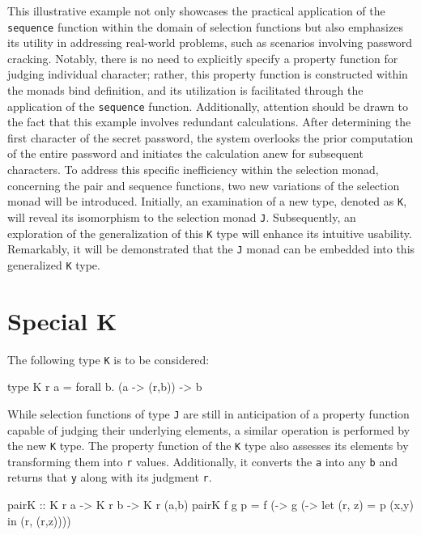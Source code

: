 \documentclass[runningheads]{llncs}
\begin{document}
This illustrative example not only showcases the practical application
of the \texttt{sequence} function within the domain of selection
functions but also emphasizes its utility in addressing real-world
problems, such as scenarios involving password cracking. Notably, there
is no need to explicitly specify a property function for judging
individual character; rather, this property function is constructed
within the monads bind definition, and its utilization is facilitated
through the application of the \texttt{sequence} function. Additionally,
attention should be drawn to the fact that this example involves
redundant calculations. After determining the first character of the
secret password, the system overlooks the prior computation of the
entire password and initiates the calculation anew for subsequent
characters. To address this specific inefficiency within the selection
monad, concerning the pair and sequence functions, two new variations of
the selection monad will be introduced. Initially, an examination of a
new type, denoted as \texttt{K}, will reveal its isomorphism to the
selection monad \texttt{J}. Subsequently, an exploration of the
generalization of this \texttt{K} type will enhance its intuitive
usability. Remarkably, it will be demonstrated that the \texttt{J} monad
can be embedded into this generalized \texttt{K} type.

\section{Special K}\label{special-k}

The following type \texttt{K} is to be considered:

\begin{code}
type K r a = forall b. (a -> (r,b)) -> b
\end{code}

While selection functions of type \texttt{J} are still in anticipation
of a property function capable of judging their underlying elements, a
similar operation is performed by the new \texttt{K} type. The property
function of the \texttt{K} type also assesses its elements by
transforming them into \texttt{r} values. Additionally, it converts the
\texttt{a} into any \texttt{b} and returns that \texttt{y} along with
its judgment \texttt{r}.

\begin{code}
pairK :: K r a -> K r b -> K r (a,b)
pairK f g p = f (\x -> 
              g (\y -> let (r, z) = p (x,y) 
                       in (r, (r,z))))
\end{code}
\end{document}
